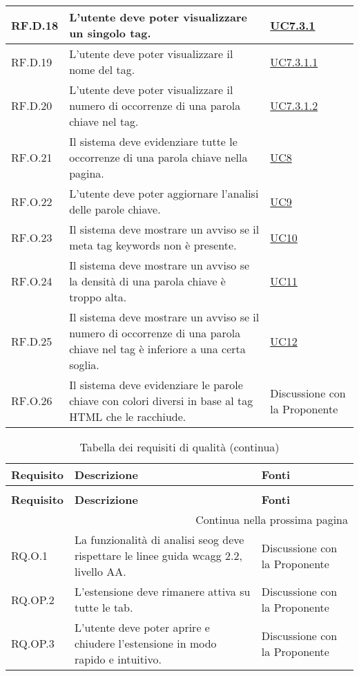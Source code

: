 \begin{longtable}{p{}p{}p{}}
\hline
RF.D.18 & L'utente deve poter visualizzare un singolo tag. & \hyperref[UC7point3point1]{UC7.3.1} \\
\hline
RF.D.19 & L'utente deve poter visualizzare il nome del tag. & \hyperref[UC7point3point1point1]{UC7.3.1.1} \\
\hline
RF.D.20 & L'utente deve poter visualizzare il numero di occorrenze di una parola chiave nel tag. & \hyperref[UC7point3point1point2]{UC7.3.1.2} \\
\hline
RF.O.21 & Il sistema deve evidenziare tutte le occorrenze di una parola chiave nella pagina. & \hyperref[UC8]{UC8} \\
\hline
RF.O.22 & L'utente deve poter aggiornare l'analisi delle parole chiave. & \hyperref[UC9]{UC9} \\
\hline
RF.O.23 & Il sistema deve mostrare un avviso se il meta tag keywords non è presente. & \hyperref[UC10]{UC10} \\
\hline
RF.O.24 & Il sistema deve mostrare un avviso se la densità di una parola chiave è troppo alta. & \hyperref[UC11]{UC11} \\
\hline
RF.D.25 & Il sistema deve mostrare un avviso se il numero di occorrenze di una parola chiave nel tag è inferiore a una certa soglia. & \hyperref[UC12]{UC12} \\
\hline
RF.O.26 & Il sistema deve evidenziare le parole chiave con colori diversi in base al tag HTML che le racchiude. & Discussione con la Proponente \\
\end{longtable}

\newpage

\renewcommand{\arraystretch}{1.5}
\begin{longtable}{p{}p{}p{}}
\caption{Tabella dei requisti di qualità}
\label{tab:requisiti-qualitativi} \\
\hline\hline
\textbf{Requisito} & \textbf{Descrizione} & \textbf{Fonti}\\
\endfirsthead
    
\caption[]{Tabella dei requisiti di qualità (continua)} \\
\hline\hline
\textbf{Requisito} & \textbf{Descrizione} & \textbf{Fonti} \\ 
\endhead
    
\multicolumn{3}{r}{{Continua nella prossima pagina}} \\ 
\endfoot
    
\hline
\endlastfoot

\hline
RQ.O.1 & La funzionalità di analisi \gls{seog} deve rispettare le linee guida \gls{wcagg} 2.2, livello AA. & Discussione con la Proponente \\
\hline
RQ.OP.2 & L'estensione deve rimanere attiva su tutte le tab. & Discussione con la Proponente \\
\hline
RQ.OP.3 & L'utente deve poter aprire e chiudere l'estensione in modo rapido e intuitivo. & Discussione con la Proponente \\
\end{longtable}

